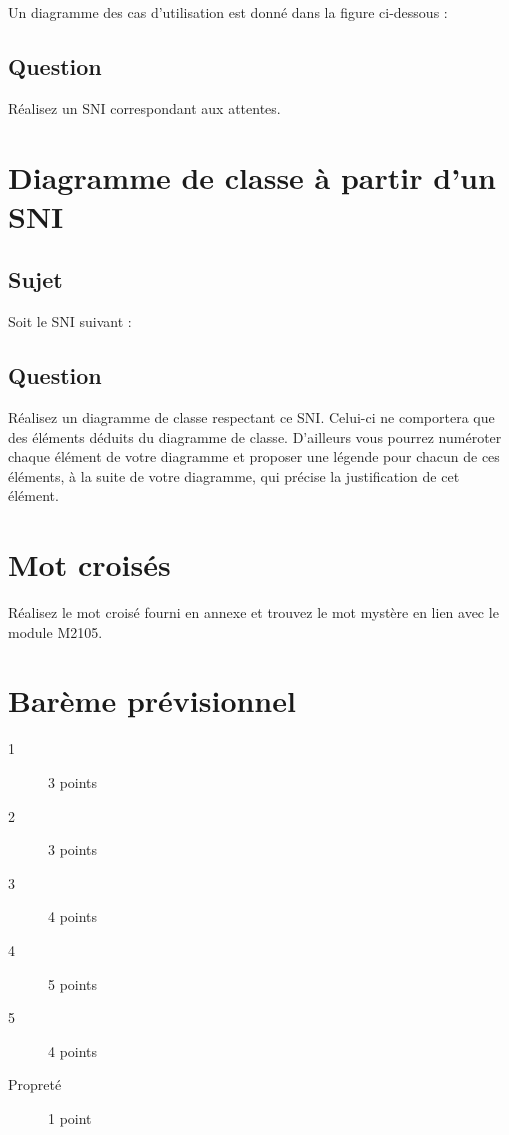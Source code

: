 \documentclass[12pt]{article}
\def\dc{\textsf{diagramme de classe}}
\def\sni{\textsf{SNI}}
\begin{document}
Un diagramme des cas d'utilisation est donné dans la figure ci-dessous :


\subsection*{Question}

Réalisez un \sni{} correspondant aux attentes.

\section{Diagramme de classe à partir d'un SNI}

\subsection*{Sujet}

Soit le \sni{} suivant :


\subsection*{Question}

Réalisez un \dc{} respectant ce \sni. Celui-ci ne comportera que des éléments déduits du \dc. D'ailleurs vous pourrez numéroter chaque élément de votre diagramme et proposer une légende pour chacun de ces éléments, à la suite de votre diagramme, qui
précise la justification de cet élément.

\section{Mot croisés}

Réalisez le mot croisé fourni en annexe et trouvez le mot mystère en lien avec le module M2105.

\section*{Bar\`eme prévisionnel}

\begin{description}
\item[1] 3 points 
\item[2] 3 points 
\item[3] 4 points 
\item[4] 5 points 
\item[5] 4 points 
\item[Propret\'e]  1 point 
\end{description}
\end{document}
